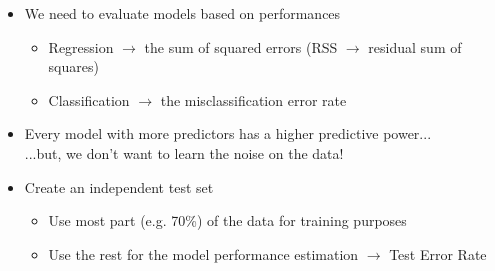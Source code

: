 \documentclass[a4paper]{article}
\begin{document}
			\begin{itemize}
				\item We need to evaluate models based on performances
					\begin{itemize}
						\item Regression $\rightarrow$ the sum of squared errors (RSS $\rightarrow$ residual sum of squares)
						\item Classification $\rightarrow$ the misclassification error rate
					\end{itemize}
				\item Every model with more predictors has a higher predictive power... \\
					...but, we don't want to learn the noise on the data!
				\item Create an independent test set
					\begin{itemize}
						\item Use most part (e.g. 70\%) of the data for training purposes
						\item Use the rest for the model performance estimation $\rightarrow$ Test Error Rate
					\end{itemize}
			\end{itemize}
		
			\newpage
				
				
				
				
				
				
\end{document}
